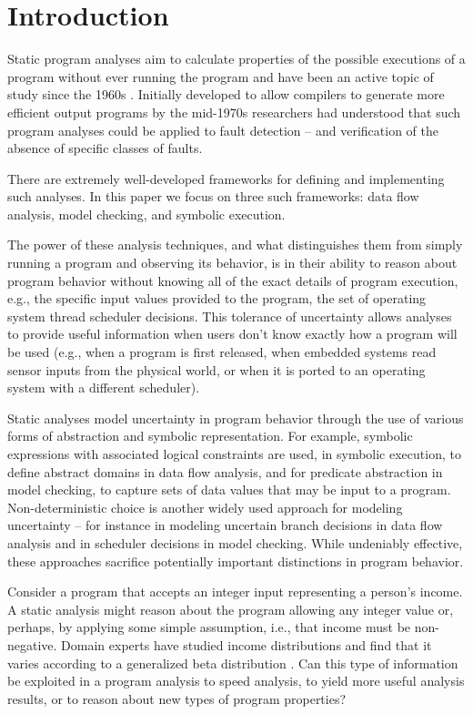 \section{Introduction}
\label{sec:introduction}

Static program analyses aim to calculate properties of 
the possible executions of a program without ever running the program
and have been an active topic of study since the 1960s \cite{First}.
Initially developed to allow compilers to generate more efficient
output programs by the mid-1970s \cite{Fosdick} researchers had
understood that such program analyses could be applied to fault
detection -- and verification of the absence of specific classes of faults.

There are extremely well-developed frameworks for defining
and implementing such analyses.  In this paper we focus on three
such frameworks: data flow analysis, model checking, and symbolic execution.

The power of these analysis techniques, and what distinguishes them from
simply running a program and observing its behavior, is in their
ability to reason about program behavior without knowing all of the
exact details of program execution, e.g., the specific 
input values provided to the program, the set of operating system
thread scheduler decisions.  This tolerance of uncertainty allows analyses
to provide useful information when users don't know exactly how
a program will be used (e.g., when a program is first released, when
embedded systems read sensor inputs from the physical world, or
when it is ported to an operating system with a different scheduler).

Static analyses model uncertainty in program behavior
through the use of various forms of abstraction and symbolic representation.
For example, symbolic expressions with associated logical constraints 
are used, in symbolic execution, to define abstract domains
in data flow analysis, and for predicate abstraction in model checking, 
to capture sets of data values that may be input to a program.
Non-deterministic choice is another widely used approach for modeling
uncertainty -- for instance in modeling uncertain branch 
decisions in data flow analysis and
in scheduler decisions in model checking.
While undeniably effective, these approaches sacrifice potentially
important distinctions in program behavior.   

Consider a program that accepts an integer input representing
a person's income.  A static analysis might reason about the program
allowing any integer value or, perhaps, by applying
some simple assumption, i.e., that income must be non-negative.
Domain experts have studied income distributions and find that
it varies according to a generalized beta distribution 
\cite{IncomeDistribution}.  Can this type of information be 
exploited in a program analysis to speed analysis,
to yield more useful analysis results, or to reason 
about new types of program properties?

